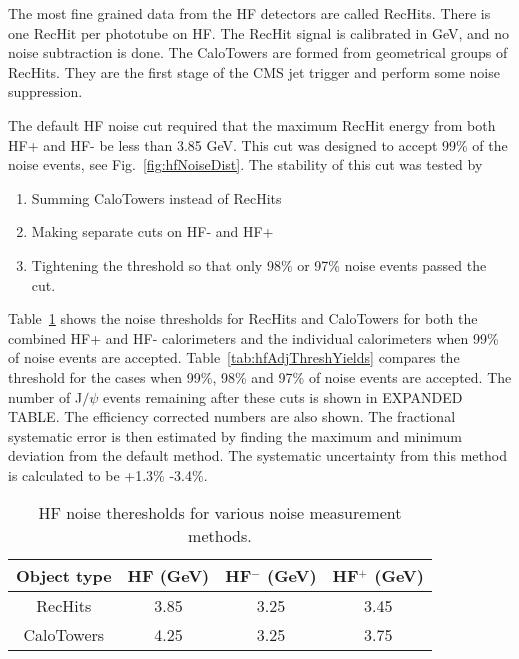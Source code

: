       The most fine grained data from the HF detectors are called RecHits. 
      There is one RecHit per phototube on HF. 
      The RecHit signal is calibrated in GeV, and no noise subtraction is done. 
      The CaloTowers are formed from geometrical groups of RecHits. 
      They are the first stage of the CMS jet trigger and perform some noise 
        suppression.

      The default HF noise cut required that the maximum RecHit energy
        from both HF+ and HF- be less than 3.85 GeV. 
      This cut was designed to accept 99\% of the noise events, 
        see Fig.~\ref{fig:hfNoiseDist}. 
      The stability of this cut was tested by
      \begin{enumerate}
        \item Summing CaloTowers instead of RecHits
        \item Making separate cuts on HF- and HF+
        \item Tightening the threshold so that only 98\% or 97\% noise events 
          passed the cut.
      \end{enumerate}

      Table~\ref{tab:hfNoiseThreshAsym} shows the noise thresholds for RecHits 
        and CaloTowers for both the combined HF+ and HF- calorimeters and the 
        individual calorimeters when 99\% of noise events are accepted.
      Table~\ref{tab:hfAdjThreshYields} compares the threshold for the cases 
        when 99\%, 98\% and 97\% of noise events are accepted.
      The number of J$/\psi$ events remaining after these cuts is shown in 
        EXPANDED TABLE. 
      The efficiency corrected numbers are also shown. 
      The fractional systematic error is then estimated by finding the maximum 
        and minimum deviation from the default method. 
      The systematic uncertainty from this method is calculated to be +1.3\% 
        -3.4\%.

      \begin{table}[!Hhbt]
        \centering
        \begin{tabular}{|c|c|c|c|}
          \hline
          Object type & HF (GeV) & HF$^{-}$ (GeV) & HF$^{+}$ (GeV) \\ \hline
          RecHits & 3.85 & 3.25 & 3.45 \\ \hline
          CaloTowers & 4.25 & 3.25 & 3.75 \\ \hline
        \end{tabular}
        \caption{HF noise theresholds for various noise measurement methods.}
        \label{tab:hfNoiseThreshAsym}
      \end{table}

